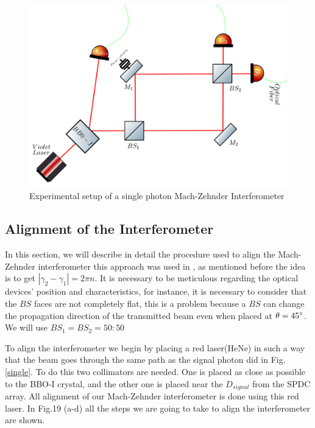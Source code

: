 \documentclass{book}
\begin{document}
\begin{figure}[!htb]
\centering
\includegraphics[width=\linewidth]{images/machzehnder_single.png}
\caption{Experimental setup of a single photon Mach-Zehnder Interferometer}
\label{newsingle}
\end{figure}

\subsection{Alignment of the Interferometer}

In this section, we will describe in detail the procedure used to align the Mach-Zehnder interferometer this approach was used in \cite{zuri}, as mentioned before the idea is to get $|\gamma_{2}-\gamma_{1}|=2\pi n$. It is necessary to be meticulous regarding the optical devices' position and characteristics, for instance, it is necessary to consider that the $BS$ faces are not completely flat, this is a problem because a $BS$ can change the propagation direction of the transmitted beam even when placed at $\theta=45\degree$. We will use $BS_{1}=BS_{2}=50:50$

To align the interferometer we begin by placing a red laser(HeNe) in such a way that the beam goes through the same path as the signal photon did in Fig. \ref{single}. To do this two collimators are needed. One is placed as close as possible to the BBO-I crystal, and the other one is placed near the $D_{signal}$ from the SPDC array. All alignment of our Mach-Zehnder interferometer is done using this red laser. In Fig.19 (a-d) all the steps we are going to take to align the interferometer are shown.
\end{document}

